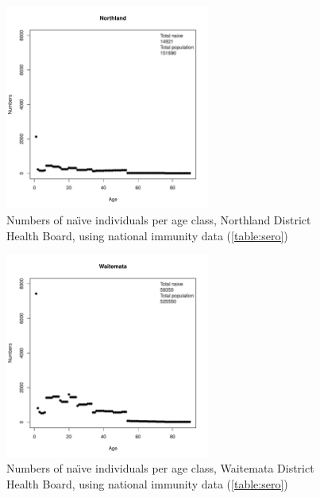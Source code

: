 \documentclass{article}
\begin{document}
\begin{figure}[H]
     \begin{center}
     \includegraphics[width=0.6\textwidth]{dhb1.pdf}
     \end{center}
     \caption{Numbers of na\"{\i}ve individuals per age class, Northland District Health Board, using national immunity data (\autoref{table:sero})}
     \label{fig:Northland}
\end{figure}


\begin{figure}[H]
     \begin{center}
     \includegraphics[width=0.6\textwidth]{dhb2.pdf}
     \end{center}
     \caption{Numbers of na\"{\i}ve individuals per age class, Waitemata District Health Board, using national immunity data (\autoref{table:sero})}
     \label{fig:Waitemata}
\end{figure}
\end{document}
